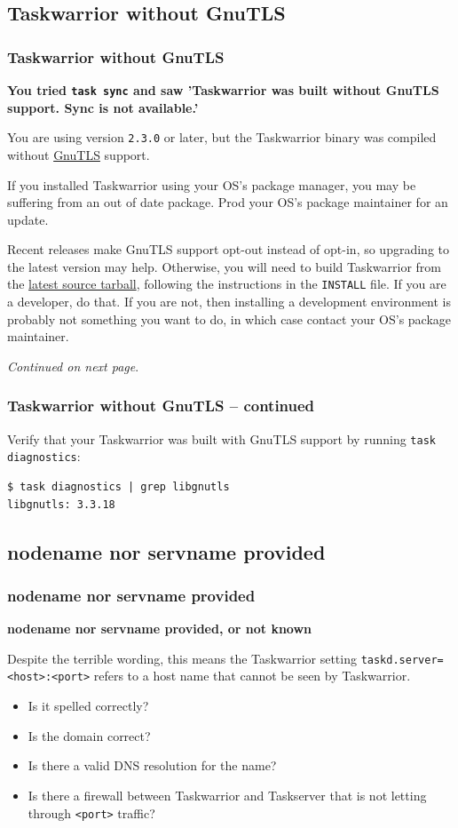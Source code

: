 \documentclass[t,handout]{beamer}
\begin{document}
\subsection{Taskwarrior without GnuTLS}

\begin{frame}[fragile]\frametitle{Taskwarrior without GnuTLS}
    \vfill
    \textbf{You tried \texttt{task sync} and saw 'Taskwarrior was built without GnuTLS support.  Sync is not available.'}

    You are using version \verb+2.3.0+ or later, but the Taskwarrior binary was compiled without \href{http://www.gnutls.org}{GnuTLS} support.

    If you installed Taskwarrior using your OS's package manager, you may be suffering from an out of date package. Prod your OS's package maintainer for an update.

    Recent releases make GnuTLS support opt-out instead of opt-in, so upgrading to the latest version may help. Otherwise, you will need to build Taskwarrior from the \href{http://taskwarrior.org/download/task-latest.tar.gz}{latest source tarball}, following the instructions in the \verb+INSTALL+ file. If you are a developer, do that. If you are not, then installing a development environment is probably not something you want to do, in which case contact your OS's package maintainer.

    \emph{Continued on next page}.
\end{frame}

\begin{frame}[fragile]\frametitle{Taskwarrior without GnuTLS -- continued}
    \vfill
    Verify that your Taskwarrior was built with GnuTLS support by running \verb+task diagnostics+:

    \begin{lstlisting}
$ task diagnostics | grep libgnutls
libgnutls: 3.3.18\end{lstlisting}
\end{frame}

\subsection{nodename nor servname provided}

\begin{frame}[fragile]\frametitle{nodename nor servname provided}
    \vfill
    \textbf{nodename nor servname provided, or not known}

    Despite the terrible wording, this means the Taskwarrior setting \verb+taskd.server=<host>:<port>+ refers to a host name that cannot be seen by Taskwarrior.

    \begin{itemize}
        \item Is it spelled correctly?
        \item Is the domain correct?
        \item Is there a valid DNS resolution for the name?
        \item Is there a firewall between Taskwarrior and Taskserver that is not letting through \verb+<port>+ traffic?
    \end{itemize}
\end{frame}
\end{document}
